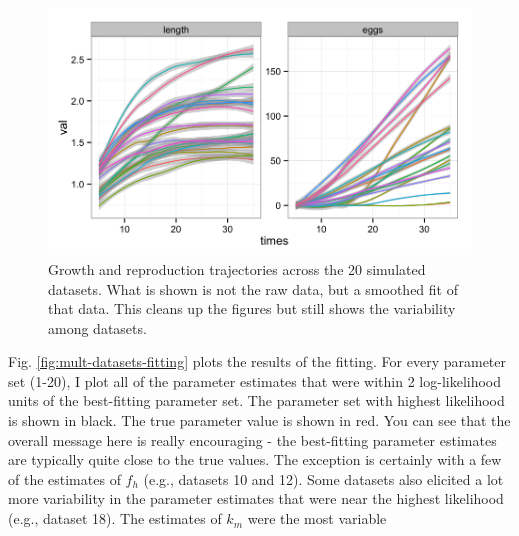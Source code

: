 \documentclass[12pt,reqno,final,pdftex]{amsart}\usepackage[]{graphicx}\usepackage[]{color}
\newenvironment{knitrout}{}{} %
\theoremstyle{plain}
\numberwithin{equation}{part}
\begin{document}
\begin{knitrout}\scriptsize
{}\color{fgcolor}\begin{figure}

\includegraphics[width=\linewidth]{figure/sim-datasets-1} \hfill{}

\caption[Growth and reproduction trajectories across the 20 simulated datasets]{Growth and reproduction trajectories across the 20 simulated datasets. What is shown is not the raw data, but a smoothed fit of that data. This cleans up the figures but still shows the variability among datasets.}\label{fig:sim-datasets}
\end{figure}


\end{knitrout}

Fig. \ref{fig:mult-datasets-fitting} plots the results of the fitting.
For every parameter set (1-20), I plot all of the parameter estimates that were within 2 log-likelihood units of the best-fitting parameter set.
The parameter set with highest likelihood is shown in black.
The true parameter value is shown in red.
You can see that the overall message here is really encouraging - the best-fitting parameter estimates are typically quite close to the true values.
The exception is certainly with a few of the estimates of $f_h$ (e.g., datasets 10 and 12).
Some datasets also elicited a lot more variability in the parameter estimates that were near the highest likelihood (e.g., dataset 18).
The estimates of $k_m$ were the most variable
\end{document}

